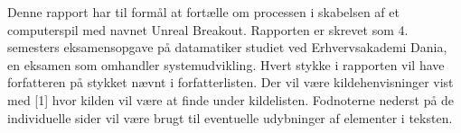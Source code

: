 Denne rapport har til formål at fortælle om processen i skabelsen af et computerspil med navnet Unreal Breakout. Rapporten er skrevet som 4. semesters eksamensopgave på datamatiker studiet ved Erhvervsakademi Dania, en eksamen som omhandler systemudvikling. Hvert stykke i rapporten vil have forfatteren på stykket nævnt i forfatterlisten. Der vil være kildehenvisninger vist med [1] hvor kilden vil være at finde under kildelisten. Fodnoterne nederst på de individuelle sider vil være brugt til eventuelle udybninger af elementer i teksten. 

